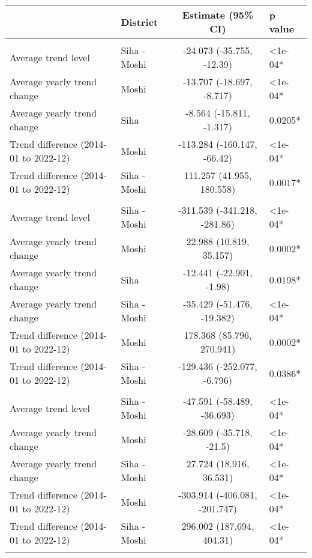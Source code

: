 \begin{longtable}{l|lcl}
\toprule
\multicolumn{1}{l}{} & District & Estimate (95\% CI) & p value \\ 
\midrule\addlinespace[2.5pt]
\multicolumn{4}{l}{Chronic Respiratory Disease} \\ 
\midrule\addlinespace[2.5pt]
Average trend level & Siha - Moshi & -24.073 (-35.755, -12.39) & <1e-04* \\ 
Average yearly trend change & Moshi & -13.707 (-18.697, -8.717) & <1e-04* \\ 
Average yearly trend change & Siha & -8.564 (-15.811, -1.317) & 0.0205* \\ 
Trend difference (2014-01 to 2022-12) & Moshi & -113.284 (-160.147, -66.42) & <1e-04* \\ 
Trend difference (2014-01 to 2022-12) & Siha - Moshi & 111.257 (41.955, 180.558) & 0.0017* \\ 
\midrule\addlinespace[2.5pt]
\multicolumn{4}{l}{Diabetes Mellitus} \\ 
\midrule\addlinespace[2.5pt]
Average trend level & Siha - Moshi & -311.539 (-341.218, -281.86) & <1e-04* \\ 
Average yearly trend change & Moshi & 22.988 (10.819, 35.157) & 0.0002* \\ 
Average yearly trend change & Siha & -12.441 (-22.901, -1.98) & 0.0198* \\ 
Average yearly trend change & Siha - Moshi & -35.429 (-51.476, -19.382) & <1e-04* \\ 
Trend difference (2014-01 to 2022-12) & Moshi & 178.368 (85.796, 270.941) & 0.0002* \\ 
Trend difference (2014-01 to 2022-12) & Siha - Moshi & -129.436 (-252.077, -6.796) & 0.0386* \\ 
\midrule\addlinespace[2.5pt]
\multicolumn{4}{l}{Epilepsy} \\ 
\midrule\addlinespace[2.5pt]
Average trend level & Siha - Moshi & -47.591 (-58.489, -36.693) & <1e-04* \\ 
Average yearly trend change & Moshi & -28.609 (-35.718, -21.5) & <1e-04* \\ 
Average yearly trend change & Siha - Moshi & 27.724 (18.916, 36.531) & <1e-04* \\ 
Trend difference (2014-01 to 2022-12) & Moshi & -303.914 (-406.081, -201.747) & <1e-04* \\ 
Trend difference (2014-01 to 2022-12) & Siha - Moshi & 296.002 (187.694, 404.31) & <1e-04* \\ 
\midrule\addlinespace[2.5pt]

\end{longtable}

